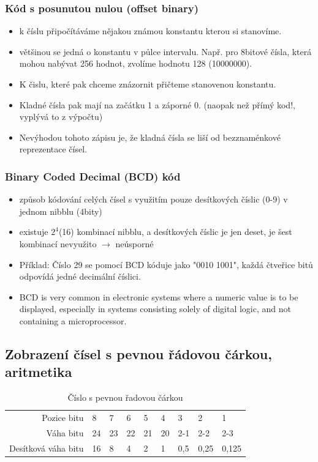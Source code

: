 \documentclass[10pt,a4paper]{article}
\begin{document}
\subsubsection{Kód s posunutou nulou (offset binary)}
\begin{itemize}
\item k číslu připočítáváme nějakou známou konstantu kterou si stanovíme.
\item většinou se jedná o konstantu v půlce intervalu. Např. pro 8bitové čísla, která mohou nabývat 256 hodnot, zvolíme hodnotu 128 (10000000).
\item K čislu, které pak chceme znázornit přičteme stanovenou konstantu.
\item Kladné čísla pak mají na začátku 1 a záporné 0. (naopak než přímý kod!, vyplývá to z výpočtu)
\item Nevýhodou tohoto zápisu je, že kladná čísla se liší od bezznaménkové reprezentace čísel.
\end{itemize}

\subsubsection{Binary Coded Decimal (BCD) kód}
\begin{itemize}
\item způsob kódování celých čísel s využitím pouze desítkových číslic (0-9) v jednom nibblu (4bity)
\item existuje $2^4$(16) kombinací nibblu, a desítkových číslic je jen deset, je šest kombinací nevyužito $\rightarrow$ neúsporné
\item Příklad: Číslo 29 se pomocí BCD kóduje jako "0010 1001", každá čtveřice bitů odpovídá jedné decimální číslici.
\item BCD is very common in electronic systems where a numeric value is to be displayed, especially in systems consisting solely of digital logic, and not containing a microprocessor.
\end{itemize}
\subsection{Zobrazení čísel s pevnou řádovou čárkou, aritmetika}
\begin{table}[ht]
\centering
\begin{tabular}{r|llllllll}
\hline
Pozice bitu         & 8  & 7  & 6  & 5  & 4  & 3   & 2    & 1     \\
Váha bitu           & 24 & 23 & 22 & 21 & 20 & 2-1 & 2-2  & 2-3   \\
Desítková váha bitu & 16 & 8  & 4  & 2  & 1  & 0,5 & 0,25 & 0,125 \\ 
\hline
\end{tabular}
\caption{Číslo s pevnou řadovou čárkou}
\label{tab:fixedPoint}
\end{table}
\end{document}
